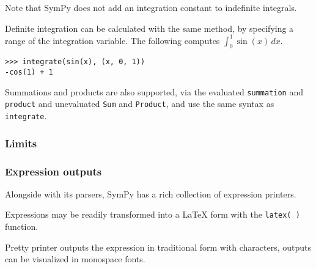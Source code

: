 Note that SymPy does not add an integration constant to indefinite integrals.

Definite integration can be calculated with the same method, by specifying a
range of the integration variable. The following computes $\int_0^1\sin(x)\,dx$.
\begin{verbatim}
>>> integrate(sin(x), (x, 0, 1))
-cos(1) + 1
\end{verbatim}

Summations and products are also supported, via the evaluated \verb|summation|
and \verb|product| and unevaluated \verb|Sum| and \verb|Product|, and use the
same syntax as \verb|integrate|.

\subsubsection{Limits}



\subsubsection{Expression outputs}

Alongside with its parsers, SymPy has a rich collection of expression printers.

Expressions may be readily transformed into a LaTeX form with the \texttt{latex( )}
function.

Pretty printer outputs the expression in traditional form with characters,
outputs can be visualized in monospace fonts.
